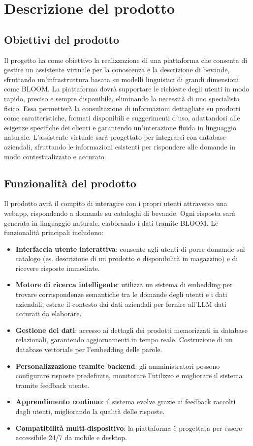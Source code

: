 \section{Descrizione del prodotto}

\subsection{Obiettivi del prodotto}
Il progetto ha come obiettivo la realizzazione di una piattaforma che consenta di 
gestire un assistente virtuale per la conoscenza e la descrizione di bevande, 
sfruttando un’infrastruttura basata su modelli linguistici di grandi dimensioni come BLOOM. 
La piattaforma dovrà supportare le richieste degli utenti in modo rapido, 
preciso e sempre disponibile, eliminando la necessità di uno specialista fisico. 
Essa permetterà la consultazione di informazioni dettagliate su prodotti come caratteristiche, 
formati disponibili e suggerimenti d’uso, adattandosi alle esigenze specifiche 
dei clienti e garantendo un’interazione fluida in linguaggio naturale. 
L’assistente virtuale sarà progettato per integrarsi con database aziendali, 
sfruttando le informazioni esistenti per rispondere alle domande in modo 
contestualizzato e accurato.

\subsection{Funzionalità del prodotto}
Il prodotto avrà il compito di interagire con i propri utenti attraverso una webapp, rispondendo a domande su cataloghi di bevande. Ogni risposta sarà generata in linguaggio naturale, elaborando i dati tramite BLOOM. Le funzionalità principali includono:
\begin{itemize}
    \item \textbf{Interfaccia utente interattiva}: consente agli utenti di porre domande sul catalogo (es. descrizione di un prodotto o disponibilità in magazzino) e di ricevere risposte immediate.
    \item \textbf{Motore di ricerca intelligente}: utilizza un sistema di embedding per trovare corrispondenze semantiche tra le domande degli utenti e i dati aziendali, estrae il contesto dai dati aziendali per fornire all'LLM dati accurati da elaborare.
    \item \textbf{Gestione dei dati}: accesso ai dettagli dei prodotti memorizzati in database relazionali, garantendo aggiornamenti in tempo reale. Costruzione di un database vettoriale per l'embedding delle parole.
    \item \textbf{Personalizzazione tramite backend}: gli amministratori possono configurare risposte predefinite, monitorare l’utilizzo e migliorare il sistema tramite feedback utente.
    \item \textbf{Apprendimento continuo}: il sistema evolve grazie ai feedback raccolti dagli utenti, migliorando la qualità delle risposte.
    \item \textbf{Compatibilità multi-dispositivo}: la piattaforma è progettata per essere accessibile 24/7 da mobile e desktop.
\end{itemize}

